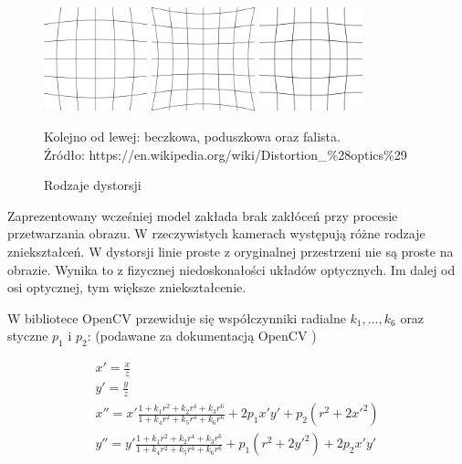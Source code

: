 \documentclass[oneside, eng]{mgr}
\begin{document}
\begin{figure}
\centering
		\begin{minipage}{3cm}
			\includegraphics[width=3cm]{img/600px-Barrel_distortion.png}
		\end{minipage}
		\begin{minipage}{3cm}
			\includegraphics[width=3cm]{img/600px-Pincushion_distortion.png}
		\end{minipage}
		\begin{minipage}{3cm}
			\includegraphics[width=3cm]{img/600px-Mustache_distortion.png}
		\end{minipage}
	\caption{Rodzaje dystorsji}
Kolejno od lewej: beczkowa, poduszkowa oraz falista. \\
Źródło: https://en.wikipedia.org/wiki/Distortion\_\%28optics\%29
	\label{fig:distortion}
\end{figure}

Zaprezentowany wcześniej model zakłada brak zakłóceń przy procesie przetwarzania obrazu. W rzeczywistych kamerach występują różne rodzaje zniekształceń. W dystorsji linie proste z oryginalnej przestrzeni nie są proste na obrazie. Wynika to z fizycznej niedoskonałości układów optycznych. Im dalej od osi optycznej, tym większe zniekształcenie.

W bibliotece OpenCV przewiduje się współczynniki radialne $k_1, ..., k_6$ oraz styczne $p_1$ i $p_2$:
(podawane za dokumentacją OpenCV \cite{Dokumentacja OpenCV})

\begin{gather*}
	x' = \frac{x}{z} \\
	y' = \frac{y}{z} \\
	x'' = x' \frac{1+k_1 r^2 + k_2 r^4 + k_3 r^6}{1+k_4 r^2+k_5 r^4+k_6 r^6} +
	2 p_1 x' y' + p_2(r^2 + 2 x'^2)	\\
	y'' = y' \frac{1+k_1 r^2 + k_2 r^4 + k_3 r^6}{1+k_4 r^2+k_5 r^4+k_6 r^6} +
	p_1(r^2 + 2 y'^2) + 2 p_2 x' y'
\end{gather*}
\end{document}
